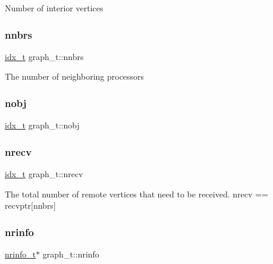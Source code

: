 Number of interior vertices \mbox{\label{structgraph__t_ab56276f68a72adf019bd226323060173}} 
\subsubsection{\texorpdfstring{nnbrs}{nnbrs}}
{\footnotesize\ttfamily \hyperlink{3rd_party_2parmetis-4_80_83_2metis_2include_2metis_8h_aaa5262be3e700770163401acb0150f52}{idx\+\_\+t} graph\+\_\+t\+::nnbrs}

The number of neighboring processors \mbox{\label{structgraph__t_a37741878bacd95f3f9f19a3cdf9fc9b2}} 
\subsubsection{\texorpdfstring{nobj}{nobj}}
{\footnotesize\ttfamily \hyperlink{3rd_party_2parmetis-4_80_83_2metis_2include_2metis_8h_aaa5262be3e700770163401acb0150f52}{idx\+\_\+t} graph\+\_\+t\+::nobj}

\mbox{\label{structgraph__t_af1a64fbb05c262288de7b2a156c60b5b}} 
\subsubsection{\texorpdfstring{nrecv}{nrecv}}
{\footnotesize\ttfamily \hyperlink{3rd_party_2parmetis-4_80_83_2metis_2include_2metis_8h_aaa5262be3e700770163401acb0150f52}{idx\+\_\+t} graph\+\_\+t\+::nrecv}

The total number of remote vertices that need to be received. nrecv == recvptr\mbox{[}nnbrs\mbox{]} \mbox{\label{structgraph__t_a2dc2c0036164197618f711c93b0d74e9}} 
\subsubsection{\texorpdfstring{nrinfo}{nrinfo}\hspace{0.1cm}{\footnotesize\ttfamily [1/2]}}
{\footnotesize\ttfamily \hyperlink{structnrinfo__t}{nrinfo\+\_\+t}$\ast$ graph\+\_\+t\+::nrinfo}

